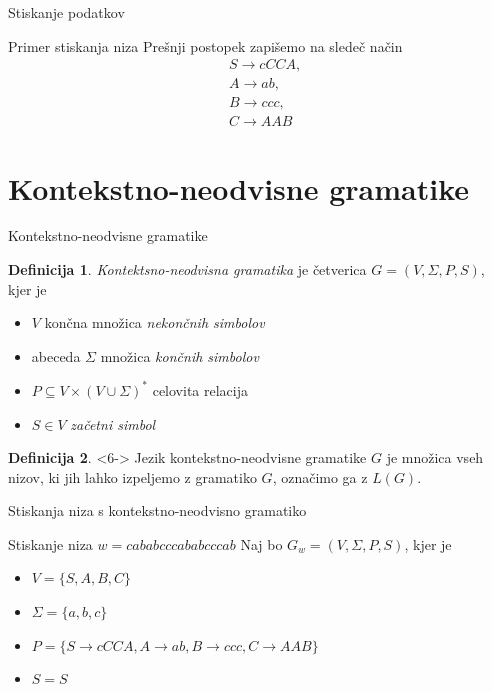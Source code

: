 \documentclass{beamer}
\theoremstyle{definition} %
\newtheorem{definicija}{Definicija}[section]
\begin{document}
\begin{frame}{Stiskanje podatkov}
    \begin{exampleblock}{Primer stiskanja niza}
        Prešnji postopek zapišemo na sledeč način
        \begin{align*}
            & S  \rightarrow  \mathit{cCCA}, \\
            & A  \rightarrow  \mathit{ab}, \\
            & B  \rightarrow  \mathit{ccc}, \\
            & C  \rightarrow  \mathit{AAB}
        \end{align*}
    \end{exampleblock}
\end{frame}

\section*{Kontekstno-neodvisne gramatike}

\begin{frame}{Kontekstno-neodvisne gramatike}
    \begin{definicija}
        \textit{Kontektsno-neodvisna gramatika} je četverica $ G = ( V, \Sigma, P, S ) $, kjer je
        \begin{itemize}
            \item<2-> $ V $ končna množica \textit{nekončnih simbolov}
            \item<3-> abeceda $ \Sigma $ množica \textit{končnih simbolov}
            \item<4-> $ P \subseteq V \times ( V \cup \Sigma )^* $ celovita relacija
            \item<5-> $ S \in V $ \textit{začetni simbol}
        \end{itemize}
    \end{definicija}
    \begin{definicija}<6->
        Jezik kontekstno-neodvisne gramatike $ G $ je množica vseh nizov, ki jih lahko izpeljemo
        z gramatiko $ G $, označimo ga z $ L(G) $.
    \end{definicija}
\end{frame}

\begin{frame}{Stiskanja niza s kontekstno-neodvisno gramatiko}
    \begin{exampleblock}{Stiskanje niza $ w = \mathit{cababcccababcccab} $}
        Naj bo $ G_w = ( V, \Sigma, P, S ) $, kjer je 
        \begin{itemize}
            \item<2-> $ V = \{ S, A, B, C \} $
            \item<3-> $ \Sigma = \{ a, b, c \} $
            \item<4-> $ P = \{ S  \rightarrow  \mathit{cCCA}, A  \rightarrow  \mathit{ab}, B  
            \rightarrow  \mathit{ccc}, C  \rightarrow  \mathit{AAB} \} $
            \item<5-> $ S = S $
        \end{itemize}
        \pause
    \end{exampleblock}
\end{frame}
\end{document}
